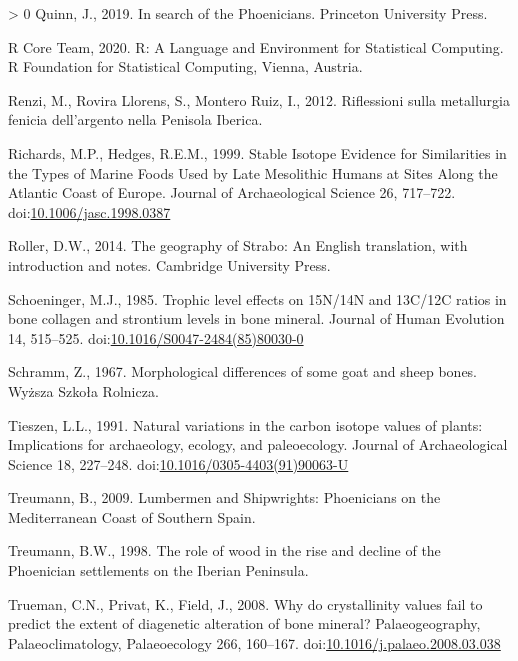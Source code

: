 \documentclass[3p]{elsarticle} %
\newlength{\cslhangindent}
\newenvironment{CSLReferences}[3] %
 {%
  \setlength{\parindent}{0pt}
  \ifodd #1 \everypar{\setlength{\hangindent}{\cslhangindent}}\ignorespaces\fi
  \ifnum #2 > 0
  \setlength{\parskip}{#2\baselineskip}
  \fi
 }%
 {}
\begin{document}
\begin{CSLReferences}{1}{0}
\leavevmode\hypertarget{ref-quinn19}{}%
Quinn, J., 2019. In search of the {Phoenicians}. {Princeton University Press}.

\leavevmode\hypertarget{ref-rcoreteam20}{}%
R Core Team, 2020. R: {A Language} and {Environment} for {Statistical Computing}. {R Foundation for Statistical Computing}, {Vienna, Austria}.

\leavevmode\hypertarget{ref-renzi_etal12}{}%
Renzi, M., Rovira Llorens, S., Montero Ruiz, I., 2012. Riflessioni sulla metallurgia fenicia dell'argento nella {Penisola Iberica}.

\leavevmode\hypertarget{ref-richards_hedges99}{}%
Richards, M.P., Hedges, R.E.M., 1999. Stable {Isotope Evidence} for {Similarities} in the {Types} of {Marine Foods Used} by {Late Mesolithic Humans} at {Sites Along} the {Atlantic Coast} of {Europe}. Journal of Archaeological Science 26, 717--722. doi:\href{https://doi.org/10.1006/jasc.1998.0387}{10.1006/jasc.1998.0387}

\leavevmode\hypertarget{ref-roller14}{}%
Roller, D.W., 2014. The geography of {Strabo}: {An English} translation, with introduction and notes. {Cambridge University Press}.

\leavevmode\hypertarget{ref-schoeninger85}{}%
Schoeninger, M.J., 1985. Trophic level effects on {15N}/{14N} and {13C}/{12C} ratios in bone collagen and strontium levels in bone mineral. Journal of Human Evolution 14, 515--525. doi:\href{https://doi.org/10.1016/S0047-2484(85)80030-0}{10.1016/S0047-2484(85)80030-0}

\leavevmode\hypertarget{ref-schramm67}{}%
Schramm, Z., 1967. Morphological differences of some goat and sheep bones. {Wyższa Szkoła Rolnicza}.

\leavevmode\hypertarget{ref-tieszen91}{}%
Tieszen, L.L., 1991. Natural variations in the carbon isotope values of plants: {Implications} for archaeology, ecology, and paleoecology. Journal of Archaeological Science 18, 227--248. doi:\href{https://doi.org/10.1016/0305-4403(91)90063-U}{10.1016/0305-4403(91)90063-U}

\leavevmode\hypertarget{ref-treumann09}{}%
Treumann, B., 2009. Lumbermen and {Shipwrights}: {Phoenicians} on the {Mediterranean Coast} of {Southern Spain}.

\leavevmode\hypertarget{ref-treumann98}{}%
Treumann, B.W., 1998. The role of wood in the rise and decline of the {Phoenician} settlements on the {Iberian Peninsula}.

\leavevmode\hypertarget{ref-trueman_etal08}{}%
Trueman, C.N., Privat, K., Field, J., 2008. Why do crystallinity values fail to predict the extent of diagenetic alteration of bone mineral? Palaeogeography, Palaeoclimatology, Palaeoecology 266, 160--167. doi:\href{https://doi.org/10.1016/j.palaeo.2008.03.038}{10.1016/j.palaeo.2008.03.038}


\end{CSLReferences}
\end{document}
